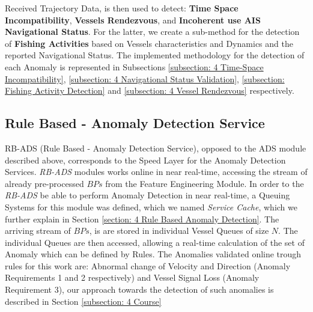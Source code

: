Received Trajectory Data, is then used to detect: \textbf{Time Space Incompatibility}, \textbf{Vessels Rendezvous}, and \textbf{Incoherent use AIS Navigational Status}. For the latter, we create a sub-method for the detection of \textbf{Fishing Activities} based on Vessels characteristics and Dynamics and the reported Navigational Status.
The implemented methodology for the detection of each Anomaly is represented in Subsections \ref{subsection: 4 Time-Space Incompatibility}, \ref{subsection: 4 Navigational Status Validation}, \ref{subsection: Fishing Activity Detection} and \ref{subsection: 4 Vessel Rendezvous} respectively.


\subsection{Rule Based - Anomaly Detection Service}
\label{subsection: 3 RB-ADS}
RB-ADS (Rule Based - Anomaly Detection Service), opposed to the ADS module described above, corresponds to the Speed Layer for the Anomaly Detection Services. \emph{RB-ADS} modules works online in near real-time, accessing the stream of already pre-processed $BPs$ from the Feature Engineering Module. In order to the \emph{RB-ADS} be able to perform Anomaly Detection in near real-time, a Queuing Systems for this module was defined, which we named \emph{Service Cache}, which we further explain in Section \ref{section: 4 Rule Based Anomaly Detection}. The arriving stream of $BPs$, is are stored in individual Vessel Queues of size $N$. The individual Queues are then accessed, allowing a real-time calculation of the set of Anomaly which can be defined by Rules. The Anomalies validated online trough rules for this work are: Abnormal change of Velocity and Direction (Anomaly Requirements 1 and 2 respectively) and Vessel Signal Loss (Anomaly Requirement 3), our approach towards the detection of such anomalies is described in Section \ref{subsection: 4 Course}  





